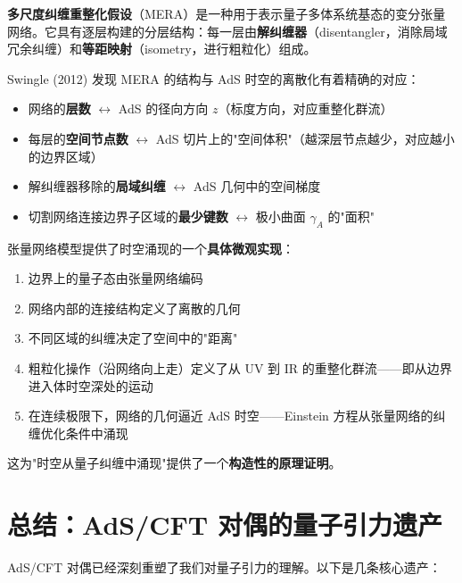 \begin{definition}
    \textbf{多尺度纠缠重整化假设}（MERA）是一种用于表示量子多体系统基态的变分张量网络。它具有逐层构建的分层结构：每一层由\textbf{解纠缠器}（disentangler，消除局域冗余纠缠）和\textbf{等距映射}（isometry，进行粗粒化）组成。
\end{definition}

Swingle (2012) 发现 MERA 的结构与 AdS 时空的离散化有着精确的对应：
\begin{itemize}
    \item 网络的\textbf{层数} $\leftrightarrow$ AdS 的径向方向 $z$（标度方向，对应重整化群流）
    \item 每层的\textbf{空间节点数} $\leftrightarrow$ AdS 切片上的"空间体积"（越深层节点越少，对应越小的边界区域）
    \item 解纠缠器移除的\textbf{局域纠缠} $\leftrightarrow$ AdS 几何中的空间梯度
    \item 切割网络连接边界子区域的\textbf{最少键数} $\leftrightarrow$ 极小曲面 $\gamma_A$ 的"面积"
\end{itemize}

\begin{remark}[涌现时空的微观机制]
    张量网络模型提供了时空涌现的一个\textbf{具体微观实现}：
    \begin{enumerate}
        \item 边界上的量子态由张量网络编码
        \item 网络内部的连接结构定义了离散的几何
        \item 不同区域的纠缠决定了空间中的"距离"
        \item 粗粒化操作（沿网络向上走）定义了从 UV 到 IR 的重整化群流——即从边界进入体时空深处的运动
        \item 在连续极限下，网络的几何逼近 AdS 时空——Einstein 方程从张量网络的纠缠优化条件中涌现
    \end{enumerate}
    这为"时空从量子纠缠中涌现"提供了一个\textbf{构造性的原理证明}。
\end{remark}

\section{总结：AdS/CFT 对偶的量子引力遗产}

AdS/CFT 对偶已经深刻重塑了我们对量子引力的理解。以下是几条核心遗产：

